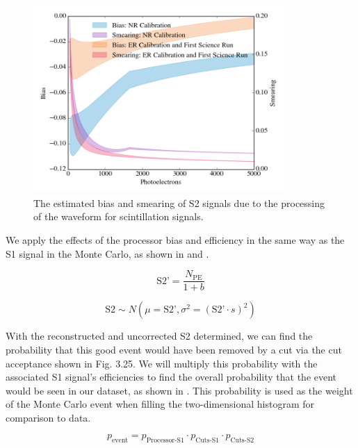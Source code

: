 \begin{figure}[t]
	\centering
	\includegraphics[width=0.85\textwidth]{xe1t_pax_s2_bias}
	\caption{The estimated bias and smearing of S2 signals due to the processing of the waveform for scintillation signals.}
	\label{fig:xe1t_s2_sb}
\end{figure}


We apply the effects of the processor bias and efficiency in the same way as the S1 signal in the Monte Carlo, as shown in  and .  

\begin{equation}
        \label{eqn:xe1t_s2_bias}
        \textrm{S2'} = \frac{N_{\textrm{PE}}}{1 + b}
\end{equation}


\begin{equation}
        \label{eqn:xe1t_s2_smearing}
        \textrm{S2} \sim N(\mu = \textrm{S2'}, \sigma^2 = (\textrm{S2'} \cdot s)^2)
\end{equation}

With the reconstructed and uncorrected S2 determined, we can find the probability that this good event would have been removed by a cut via the cut acceptance shown in Fig. 3.25. We will multiply this probability with the associated S1 signal's efficiencies to find the overall probability that the event would be seen in our dataset, as shown in .  This probability is used as the weight of the Monte Carlo event when filling the two-dimensional histogram for comparison to data.

\begin{equation}
        \label{eqn:xe1t_event_weight}
        p_{\textrm{event}} = p_{\textrm{Processor-S1}} \cdot p_{\textrm{Cuts-S1}} \cdot p_{\textrm{Cuts-S2}}
\end{equation}

